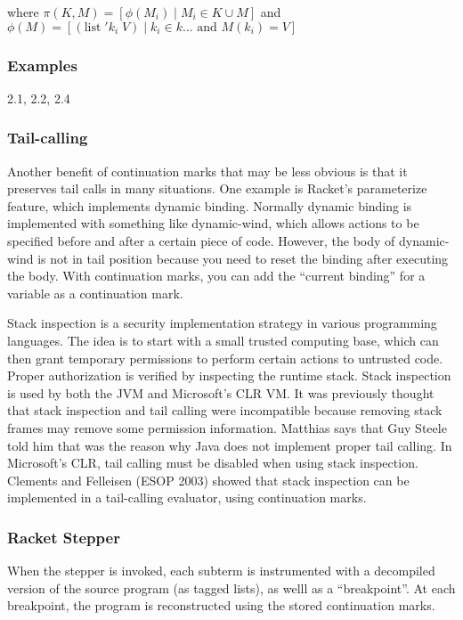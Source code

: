 \documentclass[12pt]{article}	%
\begin{document}
where $\pi(K,M) = [\phi(M_i) \mid M_i \in K \cup M]$ and $\phi(M) = [ (\textrm{list} \; 'k_i \; V) \mid k_i \in k\ldots \textrm{ and } M(k_i) = V]$

\subsubsection{Examples}
2.1, 2.2, 2.4


\subsubsection{Tail-calling}

Another benefit of continuation marks that may be less obvious is that it preserves tail calls in many situations. One example is Racket's parameterize feature, which implements dynamic binding. Normally dynamic binding is implemented with something like dynamic-wind, which allows actions to be specified before and after a certain piece of code. However, the body of dynamic-wind is not in tail position because you need to reset the binding after executing the body. With continuation marks, you can add the ``current binding'' for a variable as a continuation mark. 

Stack inspection is a security implementation strategy in various programming languages. The idea is to start with a small trusted computing base, which can then grant temporary permissions to perform certain actions to untrusted code. Proper authorization is verified by inspecting the runtime stack. Stack inspection is used by both the JVM and Microsoft's CLR VM. It was previously thought that stack inspection and tail calling were incompatible because removing stack frames may remove some permission information. Matthias says that Guy Steele told him that was the reason why Java does not implement proper tail calling. In Microsoft's CLR, tail calling must be disabled when using stack inspection. Clements and Felleisen (ESOP 2003) showed that stack inspection can be implemented in a tail-calling evaluator, using continuation marks.




\subsubsection{Racket Stepper}

When the stepper is invoked, each subterm is instrumented with a decompiled version of the source program (as tagged lists), as welll as a ``breakpoint''. At each breakpoint, the program is reconstructed using the stored continuation marks.

%
%
\end{document}
